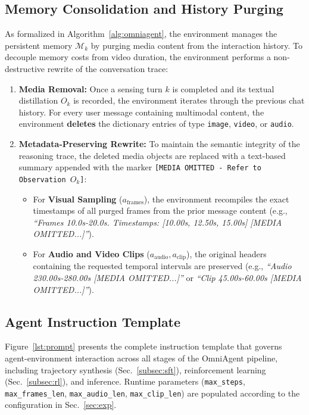 \documentclass{article}
\theoremstyle{plain}
\theoremstyle{definition}
\theoremstyle{remark}
\begin{document}
\subsection{Memory Consolidation and History Purging}
As formalized in Algorithm~\ref{alg:omniagent}, the environment manages the persistent memory $\mathcal{M}_k$ by purging media content from the interaction history. To decouple memory costs from video duration, the environment performs a non-destructive rewrite of the conversation trace:

\begin{enumerate}[leftmargin=15pt, topsep=2pt]
    \item \textbf{Media Removal:} Once a sensing turn $k$ is completed and its textual distillation $O_k$ is recorded, the environment iterates through the previous chat history. For every user message containing multimodal content, the environment \textbf{deletes} the dictionary entries of type \texttt{image}, \texttt{video}, or \texttt{audio}.
    
    \item \textbf{Metadata-Preserving Rewrite:} To maintain the semantic integrity of the reasoning trace, the deleted media objects are replaced with a text-based summary appended with the marker \texttt{[MEDIA OMITTED - Refer to Observation $O_k$]}:
    \begin{itemize}
        \item For \textbf{Visual Sampling} ($a_{\text{frames}}$), the environment recompiles the exact timestamps of all purged frames from the prior message content (e.g., \textit{``Frames 10.0s-20.0s. Timestamps: [10.00s, 12.50s, 15.00s] [MEDIA OMITTED...]''}).
        \item For \textbf{Audio and Video Clips} ($a_{\text{audio}}, a_{\text{clip}}$), the original headers containing the requested temporal intervals are preserved (e.g., \textit{``Audio 230.00s-280.00s [MEDIA OMITTED...]''} or \textit{``Clip 45.00s-60.00s [MEDIA OMITTED...]''}).
    \end{itemize}
\end{enumerate}


\subsection{Agent Instruction Template}
\label{app:prompt}

Figure~\ref{lst:prompt} presents the complete instruction template
that governs agent-environment interaction across all stages of the
OmniAgent pipeline, including trajectory synthesis
(Sec.~\ref{subsec:sft}), reinforcement learning
(Sec.~\ref{subsec:rl}), and inference. Runtime parameters
(\texttt{max\_steps}, \texttt{max\_frames\_len},
\texttt{max\_audio\_len}, \texttt{max\_clip\_len}) are populated
according to the configuration in Sec.~\ref{sec:exp}.
\end{document}
